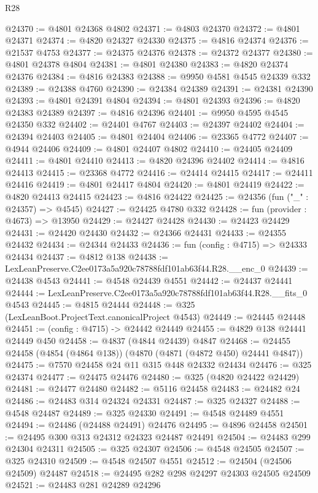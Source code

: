 \begin{lexlean}{R28}
\begin{coremodule}
@24370 := @4801 @24368 @4802
@24371 := @4803 @24370
@24372 := @4801 @24371
@24374 := @4820 @24327 @24330
@24375 := @4816 @24374
@24376 := @21537 @4753
@24377 := @24375 @24376
@24378 := @24372 @24377
@24380 := @4801 @24378 @4804
@24381 := @4801 @24380
@24383 := @4820 @24374 @24376
@24384 := @4816 @24383
@24388 := @9950 @4581 @4545 @24339 @332
@24389 := @24388 @4760
@24390 := @24384 @24389
@24391 := @24381 @24390
@24393 := @4801 @24391 @4804
@24394 := @4801 @24393
@24396 := @4820 @24383 @24389
@24397 := @4816 @24396
@24401 := @9950 @4595 @4545 @24350 @332
@24402 := @24401 @4767
@24403 := @24397 @24402
@24404 := @24394 @24403
@24405 := @4801 @24404
@24406 := @23365 @4772
@24407 := @4944 @24406
@24409 := @4801 @24407 @4802
@24410 := @24405 @24409
@24411 := @4801 @24410
@24413 := @4820 @24396 @24402
@24414 := @4816 @24413
@24415 := @23368 @4772
@24416 := @24414 @24415
@24417 := @24411 @24416
@24419 := @4801 @24417 @4804
@24420 := @4801 @24419
@24422 := @4820 @24413 @24415
@24423 := @4816 @24422
@24425 := @24356 (fun ("_" : @24357) => @4545)
@24427 := @24425 @4780 @332
@24428 := fun (provider : @4673) => @13950
@24429 := @24427 @24428
@24430 := @24423 @24429
@24431 := @24420 @24430
@24432 := @24366 @24431
@24433 := @24355 @24432
@24434 := @24344 @24433
@24436 := fun (config : @4715) => @24333 @24434
@24437 := @4812 @138
@24438 := LexLeanPreserve.C2ee0173a5a920c78788fdf101ab63f44.R28.__enc_0
@24439 := @24438 @4543
@24441 := @4548 @24439 @4551
@24442 := @24437 @24441
@24444 := LexLeanPreserve.C2ee0173a5a920c78788fdf101ab63f44.R28.__fits_0 @4543
@24445 := @4815 @24444
@24448 := @325 (LexLeanBoot.ProjectText.canonicalProject @4543)
@24449 := @24445 @24448
@24451 := (config : @4715) -> @24442 @24449
@24455 := @4829 @138 @24441 @24449 @450
@24458 := @4837 (@4844 @24439) @4847
@24468 := @24455 @24458 (@4854 (@4864 @138)) (@4870 (@4871 (@4872 @450) @24441 @4847))
@24475 := @7570 @24458 @24 @11 @315 @448 @24332 @24434
@24476 := @325 @24374
@24477 := @24475 @24476
@24480 := @325 (@4820 @24422 @24429)
@24481 := @24477 @24480
@24482 := @5116 @24458
@24483 := @24482 @24
@24486 := @24483 @314 @24324 @24331
@24487 := @325 @24327
@24488 := @4548 @24487
@24489 := @325 @24330
@24491 := @4548 @24489 @4551
@24494 := @24486 (@24488 @24491) @24476
@24495 := @4896 @24458
@24501 := @24495 @300 @313 @24312 @24323 @24487 @24491
@24504 := @24483 @299 @24304 @24311
@24505 := @325 @24307
@24506 := @4548 @24505
@24507 := @325 @24310
@24509 := @4548 @24507 @4551
@24512 := @24504 (@24506 @24509) @24487
@24518 := @24495 @282 @298 @24297 @24303 @24505 @24509
@24521 := @24483 @281 @24289 @24296

\end{coremodule}
\end{lexlean}
